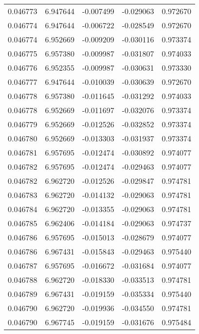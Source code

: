 \begin{tabular}{lrrrr}
0.046773    &  6.947644 & -0.007499 & -0.029063 &             0.972670 \\
0.046774    &  6.947644 & -0.006722 & -0.028549 &             0.972670 \\
0.046774    &  6.952669 & -0.009209 & -0.030116 &             0.973374 \\
0.046775    &  6.957380 & -0.009987 & -0.031807 &             0.974033 \\
0.046776    &  6.952355 & -0.009987 & -0.030631 &             0.973330 \\
0.046777    &  6.947644 & -0.010039 & -0.030639 &             0.972670 \\
0.046778    &  6.957380 & -0.011645 & -0.031292 &             0.974033 \\
0.046778    &  6.952669 & -0.011697 & -0.032076 &             0.973374 \\
0.046779    &  6.952669 & -0.012526 & -0.032852 &             0.973374 \\
0.046780    &  6.952669 & -0.013303 & -0.031937 &             0.973374 \\
0.046781    &  6.957695 & -0.012474 & -0.030892 &             0.974077 \\
0.046782    &  6.957695 & -0.012474 & -0.029463 &             0.974077 \\
0.046782    &  6.962720 & -0.012526 & -0.029847 &             0.974781 \\
0.046783    &  6.962720 & -0.014132 & -0.029063 &             0.974781 \\
0.046784    &  6.962720 & -0.013355 & -0.029063 &             0.974781 \\
0.046785    &  6.962406 & -0.014184 & -0.029063 &             0.974737 \\
0.046786    &  6.957695 & -0.015013 & -0.028679 &             0.974077 \\
0.046786    &  6.967431 & -0.015843 & -0.029463 &             0.975440 \\
0.046787    &  6.957695 & -0.016672 & -0.031684 &             0.974077 \\
0.046788    &  6.962720 & -0.018330 & -0.033513 &             0.974781 \\
0.046789    &  6.967431 & -0.019159 & -0.035334 &             0.975440 \\
0.046790    &  6.962720 & -0.019936 & -0.034550 &             0.974781 \\
0.046790    &  6.967745 & -0.019159 & -0.031676 &             0.975484 \\

\end{tabular}
